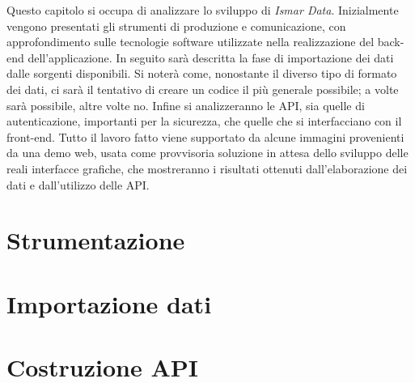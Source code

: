 \documentclass[./main.tex]{subfiles}
\begin{document}
Questo capitolo si occupa di analizzare lo sviluppo di \textit{Ismar Data}. Inizialmente vengono presentati gli strumenti di produzione e comunicazione, con approfondimento sulle tecnologie software utilizzate nella realizzazione del back-end dell'applicazione. In seguito sarà descritta la fase di importazione dei dati dalle sorgenti disponibili. Si noterà come, nonostante il diverso tipo di formato dei dati, ci sarà il tentativo di creare un codice il più generale possibile; a volte sarà possibile, altre volte no. Infine si analizzeranno le API, sia quelle di autenticazione, importanti per la sicurezza, che quelle che si interfacciano con il front-end. Tutto il lavoro fatto viene supportato da alcune immagini provenienti da una demo web, usata come provvisoria soluzione in attesa dello sviluppo delle reali interfacce grafiche, che mostreranno i risultati ottenuti dall'elaborazione dei dati e dall'utilizzo delle API. 

\section{Strumentazione}


\section{Importazione dati}


\section{Costruzione API}\label{sec:api}

\end{document}
